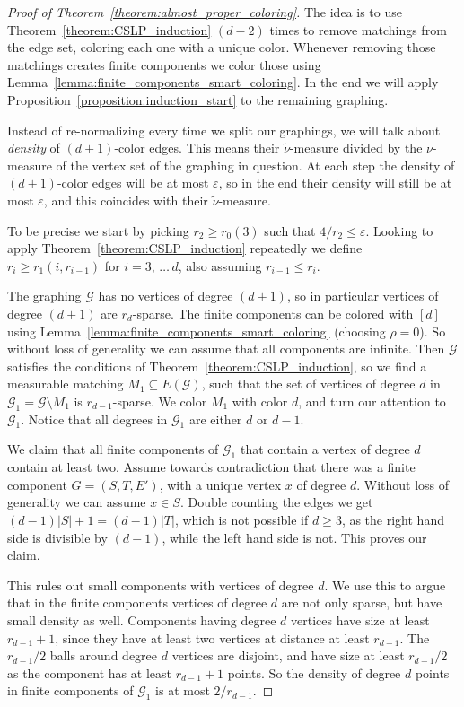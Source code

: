\documentclass[11pt]{article}
\theoremstyle{definition}
\numberwithin{equation}{section}
\numberwithin{figure}{section}
\numberwithin{table}{section}
\newcommand{\G}{\mathcal{G}}
\begin{document}

\begin{proof}[Proof of Theorem~\ref{theorem:almost_proper_coloring}]
The idea is to use Theorem~\ref{theorem:CSLP_induction} $(d-2)$ times to remove matchings from the edge set, coloring each one with a unique color. Whenever removing those matchings creates finite components we color those using Lemma~\ref{lemma:finite_components_smart_coloring}. In the end we will apply Proposition~\ref{proposition:induction_start} to the remaining graphing.

Instead of re-normalizing every time we split our graphings, we will talk about \emph{density} of $(d+1)$-color edges. This means their $\widetilde{\nu}$-measure divided by the $\nu$-measure of the vertex set of the graphing in question. At each step the density of $(d+1)$-color edges will be at most $\varepsilon$, so in the end their density will still be at most $\varepsilon$, and this coincides with their $\widetilde{\nu}$-measure.

To be precise we start by picking $r_2 \geq r_0(3)$ such that $4/r_2 \leq \varepsilon$. Looking to apply Theorem~\ref{theorem:CSLP_induction} repeatedly we define $r_i \geq r_1(i, r_{i-1})$ for $i=3,\,\ldots\,d$, also assuming $r_{i-1} \leq r_i$.

The graphing $\G$ has no vertices of degree $(d+1)$, so in particular vertices of degree $(d+1)$ are $r_d$-sparse. The finite components can be colored with $[d]$ using Lemma~\ref{lemma:finite_components_smart_coloring} (choosing $\rho =0$). So without loss of generality we can assume that all components are infinite. Then $\G$ satisfies the conditions of Theorem~\ref{theorem:CSLP_induction}, so we find a measurable matching $M_1 \subseteq E(\G)$, such that the set of vertices of degree $d$ in $\G_1=\G \setminus M_1$ is $r_{d-1}$-sparse. We color $M_1$ with color $d$, and turn our attention to $\G_1$. Notice that all degrees in $\G_1$ are either $d$ or $d-1$.

We claim that all finite components of $\G_1$ that contain a vertex of degree $d$ contain at least two. Assume towards contradiction that there was a finite component $G=(S,T, E')$, with a unique vertex $x$ of degree $d$. Without loss of generality we can assume $x \in S$. Double counting the edges we get $(d-1)|S|+1 = (d-1)|T|$, which is not possible if $d \geq 3$, as the right hand side is divisible by $(d-1)$, while the left hand side is not. This proves our claim.

This rules out small components with vertices of degree $d$. We use this to argue that in the finite components vertices of degree $d$ are not only sparse, but have small density as well. Components having degree $d$ vertices have size at least $r_{d-1}+1$, since they have at least two vertices at distance at least $r_{d-1}$. The $r_{d-1}/2$ balls around degree $d$ vertices are disjoint, and have size at least $r_{d-1}/2$ as the component has at least $r_{d-1}+1$ points. So the density of degree $d$ points in finite components of $\G_1$ is at most $2 / r_{d-1}$.


\end{proof}
\end{document}
